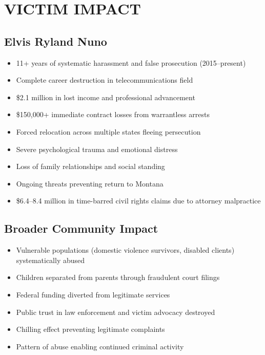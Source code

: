 \documentclass[12pt,oneside]{article}
\begin{document}
\section*{VICTIM IMPACT}

\subsection*{Elvis Ryland Nuno}

\begin{itemize}
\item 11+ years of systematic harassment and false prosecution (2015--present)
\item Complete career destruction in telecommunications field
\item \$2.1 million in lost income and professional advancement
\item \$150,000+ immediate contract losses from warrantless arrests
\item Forced relocation across multiple states fleeing persecution
\item Severe psychological trauma and emotional distress
\item Loss of family relationships and social standing
\item Ongoing threats preventing return to Montana
\item \$6.4--8.4 million in time-barred civil rights claims due to attorney malpractice
\end{itemize}

\subsection*{Broader Community Impact}

\begin{itemize}
\item Vulnerable populations (domestic violence survivors, disabled clients) systematically abused
\item Children separated from parents through fraudulent court filings
\item Federal funding diverted from legitimate services
\item Public trust in law enforcement and victim advocacy destroyed
\item Chilling effect preventing legitimate complaints
\item Pattern of abuse enabling continued criminal activity
\end{itemize}
\end{document}
